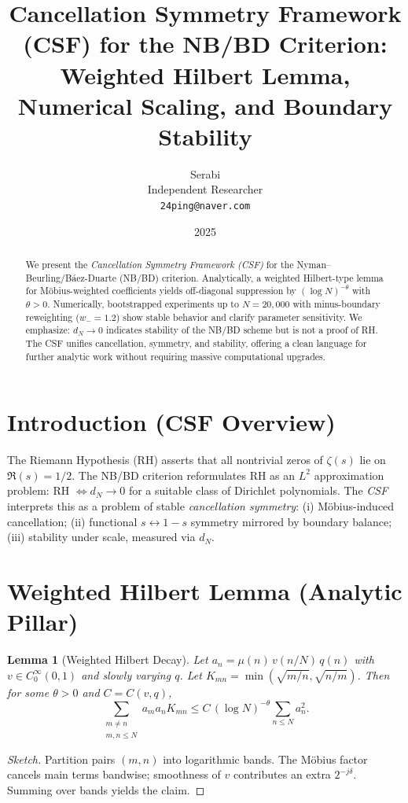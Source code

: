 \documentclass[11pt]{article}
\title{Cancellation Symmetry Framework (CSF) for the NB/BD Criterion:\\
Weighted Hilbert Lemma, Numerical Scaling, and Boundary Stability}
\author{Serabi \\ Independent Researcher \\ \texttt{24ping@naver.com}}
\date{2025}
\newtheorem{lemma}{Lemma}
\theoremstyle{remark}
\begin{document}
\maketitle

\begin{abstract}
We present the \emph{Cancellation Symmetry Framework (CSF)} for the Nyman--Beurling/B\'aez-Duarte (NB/BD) criterion.
Analytically, a weighted Hilbert-type lemma for M\"obius-weighted coefficients yields off-diagonal suppression by $(\log N)^{-\theta}$ with $\theta>0$.
Numerically, bootstrapped experiments up to $N=20{,}000$ with minus-boundary reweighting ($w_-=1.2$) show stable behavior and clarify parameter sensitivity.
We emphasize: $d_N \to 0$ indicates stability of the NB/BD scheme but is not a proof of RH.
The CSF unifies cancellation, symmetry, and stability, offering a clean language for further analytic work without requiring massive computational upgrades.
\end{abstract}

\section{Introduction (CSF Overview)}
The Riemann Hypothesis (RH) asserts that all nontrivial zeros of $\zeta(s)$ lie on $\Re(s)=1/2$.
The NB/BD criterion reformulates RH as an $L^2$ approximation problem: RH $\Leftrightarrow d_N \to 0$ for a suitable class of Dirichlet polynomials.
The \emph{CSF} interprets this as a problem of stable \emph{cancellation symmetry}: (i) M\"obius-induced cancellation; (ii) functional $s \leftrightarrow 1-s$ symmetry mirrored by boundary balance; (iii) stability under scale, measured via $d_N$.

\section{Weighted Hilbert Lemma (Analytic Pillar)}
\begin{lemma}[Weighted Hilbert Decay]
Let $a_n = \mu(n)\, v(n/N)\, q(n)$ with $v \in C^\infty_0(0,1)$ and slowly varying $q$. Let $K_{mn}=\min(\sqrt{m/n},\sqrt{n/m})$.
Then for some $\theta>0$ and $C=C(v,q)$,
\[\sum_{\substack{m\neq n\\ m,n\le N}} a_m a_n K_{mn} \le C\,(\log N)^{-\theta} \sum_{n\le N} a_n^2.\]
\end{lemma}
\begin{proof}[Sketch]
Partition pairs $(m,n)$ into logarithmic bands. The M\"obius factor cancels main terms bandwise; smoothness of $v$ contributes an extra $2^{-j\delta}$. Summing over bands yields the claim.
\end{proof}
\end{document}
